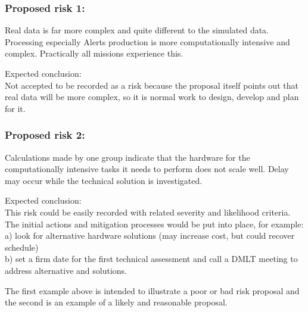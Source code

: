 \subsubsection*{Proposed risk 1:}

Real data is far more complex and quite different to the simulated data. Processing especially Alerts production is more computationally intensive and complex.
Practically all missions experience this.

Expected conclusion:\\
Not accepted to be recorded as a risk because the proposal itself points out that real data will be more complex, so it is normal work to design, develop and plan for it.

\subsubsection*{Proposed risk 2:}

Calculations made by  one group indicate that the hardware for the computationally intensive tasks it needs to perform does not scale well. Delay may occur while the technical solution is investigated.

Expected conclusion:\\
This risk could be easily recorded with related severity and likelihood criteria. The initial actions and mitigation processes would be put into place,  for example: \\
a)	look for alternative hardware solutions (may increase cost, but could recover schedule)\\
b)	set a firm date for the first technical assessment and call a DMLT meeting to address alternative and solutions.

The first example above is intended to illustrate a poor or bad risk proposal and the second is an example of a likely and reasonable proposal.

